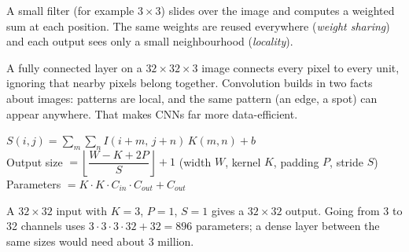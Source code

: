\documentclass[11pt,a4paper]{article}
\begin{document}

\begin{bdef}
A small filter (for example $3\times3$) slides over the image and computes a weighted sum at each position. The same weights are reused everywhere (\emph{weight sharing}) and each output sees only a small neighbourhood (\emph{locality}).
\end{bdef}
A fully connected layer on a $32\times32\times3$ image connects every pixel to every unit, ignoring that nearby pixels belong together. Convolution builds in two facts about images: patterns are local, and the same pattern (an edge, a spot) can appear anywhere. That makes CNNs far more data-efficient.
\begin{bmath}[Formulas]
$S(i,j)=\sum_m\sum_n I(i+m,\,j+n)\,K(m,n)+b$\\[3pt]
Output size $=\left\lfloor\dfrac{W-K+2P}{S}\right\rfloor+1$ \;(width $W$, kernel $K$, padding $P$, stride $S$)\\[3pt]
Parameters $=K\cdot K\cdot C_{in}\cdot C_{out}+C_{out}$
\end{bmath}
\begin{bex}
A $32\times32$ input with $K=3$, $P=1$, $S=1$ gives a $32\times32$ output. Going from 3 to 32 channels uses $3\cdot3\cdot3\cdot32+32=896$ parameters; a dense layer between the same sizes would need about 3 million.
\end{bex}
\end{document}
